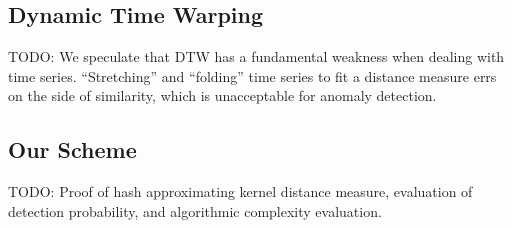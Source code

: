 \documentclass[a4paper]{article}
\makeatletter
\theoremstyle{def}
\theoremstyle{thm}
\newcommand{\todo}[1]{}
\renewcommand{\todo}[1]{{\color{red} TODO\@: {#1}}}
\makeatother
\begin{document}
\subsection{Dynamic Time Warping}

\todo{We speculate that DTW has a fundamental weakness when dealing with time series.
    ``Stretching'' and ``folding'' time series to fit a distance measure errs on the side of similarity, which is unacceptable for anomaly detection.}

\subsection{Our Scheme}

\todo{Proof of hash approximating kernel distance measure, evaluation of detection probability, and algorithmic complexity evaluation.}



\end{document}
